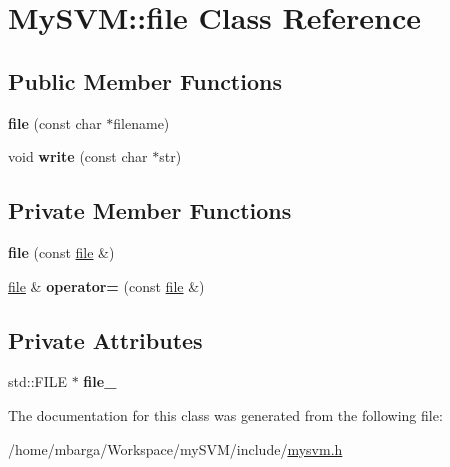 \hypertarget{classMySVM_1_1file}{
\section{MySVM::file Class Reference}
\label{classMySVM_1_1file}
}
\subsection*{Public Member Functions}
\begin{DoxyCompactItemize}
\item 
\hypertarget{classMySVM_1_1file_aca21d3ad46eea95d88524bde69bcb065}{
{\bfseries file} (const char $\ast$filename)}
\label{classMySVM_1_1file_aca21d3ad46eea95d88524bde69bcb065}

\item 
\hypertarget{classMySVM_1_1file_a82f6146f73a742f3c225c223b1e5bac1}{
void {\bfseries write} (const char $\ast$str)}
\label{classMySVM_1_1file_a82f6146f73a742f3c225c223b1e5bac1}

\end{DoxyCompactItemize}
\subsection*{Private Member Functions}
\begin{DoxyCompactItemize}
\item 
\hypertarget{classMySVM_1_1file_a6251d147f1fca9c7ca209defff1a0c4d}{
{\bfseries file} (const \hyperlink{classMySVM_1_1file}{file} \&)}
\label{classMySVM_1_1file_a6251d147f1fca9c7ca209defff1a0c4d}

\item 
\hypertarget{classMySVM_1_1file_a657c303b1039a84ed89978affd06819c}{
\hyperlink{classMySVM_1_1file}{file} \& {\bfseries operator=} (const \hyperlink{classMySVM_1_1file}{file} \&)}
\label{classMySVM_1_1file_a657c303b1039a84ed89978affd06819c}

\end{DoxyCompactItemize}
\subsection*{Private Attributes}
\begin{DoxyCompactItemize}
\item 
\hypertarget{classMySVM_1_1file_a3aaea22e2573a209cf6068b9cc46a5c2}{
std::FILE $\ast$ {\bfseries file\_\-}}
\label{classMySVM_1_1file_a3aaea22e2573a209cf6068b9cc46a5c2}

\end{DoxyCompactItemize}


The documentation for this class was generated from the following file:\begin{DoxyCompactItemize}
\item 
/home/mbarga/Workspace/mySVM/include/\hyperlink{mysvm_8h}{mysvm.h}\end{DoxyCompactItemize}
